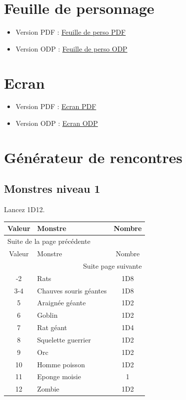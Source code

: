 \documentclass[a4paper, 11pt, twoside]{article}
\begin{document}
\section{Feuille de personnage}
\label{sec:orgf817d2c}

\begin{itemize}
\item Version PDF : \href{https://github.com/orey/jdr/blob/master/DungeonSquad-fr/DungeonSquadFr-FeuillePerso.pdf}{Feuille de perso PDF}
\item Version ODP : \href{https://github.com/orey/jdr/blob/master/DungeonSquad-fr/DungeonSquadFr-FeuillePerso.odp}{Feuille de perso ODP}
\end{itemize}

\section{Ecran}
\label{sec:orgff54e6b}

\begin{itemize}
\item Version PDF : \href{https://github.com/orey/jdr/blob/master/DungeonSquad-fr/DungeonSquadFr-Ecran.pdf}{Ecran PDF}
\item Version ODP : \href{https://github.com/orey/jdr/blob/master/DungeonSquad-fr/DungeonSquadFr-Ecran.odp}{Ecran ODP}
\end{itemize}

\section{Générateur de rencontres}
\label{sec:orgc9019c0}

\subsection{Monstres niveau 1}
\label{sec:orgff63928}

Lancez 1D12.

\begin{longtable}{c|l|c}
Valeur & Monstre & Nombre\\
\hline
\endfirsthead
\multicolumn{3}{l}{Suite de la page précédente} \\
\hline

Valeur & Monstre & Nombre \\

\hline
\endhead
\hline\multicolumn{3}{r}{Suite page suivante} \\
\endfoot
\endlastfoot
\hline
1-2 & Rats & 1D8\\
3-4 & Chauves souris géantes & 1D8\\
5 & Araignée géante & 1D2\\
6 & Goblin & 1D2\\
7 & Rat géant & 1D4\\
8 & Squelette guerrier & 1D2\\
9 & Orc & 1D2\\
10 & Homme poisson & 1D2\\
11 & Eponge moisie & 1\\
12 & Zombie & 1D2\\
\end{longtable}
\end{document}
